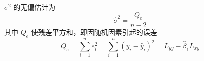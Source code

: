  $ \sigma^2 $ 的无偏估计为 \begin{equation}
    \hat{\sigma}^2  = \frac{Q_e}{n-2}
\end{equation}
其中 $ Q_e $ 使残差平方和，即因随机因素引起的误差
\begin{equation}
    Q_e = \sum_{i=1}^{n} e_i^2 = \sum_{i=1}^{n}(y_i - \hat{y}_i)^2 = L_{yy} - \hat{\beta}_1 L_{xy}
\end{equation}

